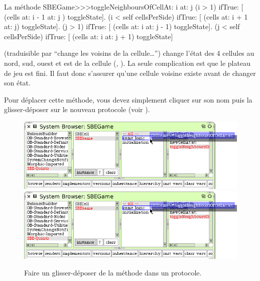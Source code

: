 \documentclass[a4paper,10pt,twoside]{book}
\begin{document}
\begin{method}[toggleNeighboursOfCellAt:at:]{La méthode \callback}
SBEGame>>>toggleNeighboursOfCellAt: i at: j
   (i > 1) ifTrue: [ (cells at: i - 1 at: j ) toggleState].
   (i < self cellsPerSide) ifTrue: [ (cells at: i + 1 at: j) toggleState].
   (j > 1) ifTrue: [ (cells at: i  at: j - 1) toggleState].
   (j < self cellsPerSide) ifTrue: [ (cells at: i at: j + 1) toggleState]
\end{method}

 (traduisible par ``change les
voisins de la cellule\ldots'') change l'état des 4 cellules au nord, sud, ouest et est de la cellule (, ). La seule complication est que le plateau de jeu est fini. Il faut donc s'assurer qu'une cellule voisine existe avant de changer son état.

Pour déplacer cette méthode, vous devez simplement cliquer sur son nom
puis la glisser-d\'eposer sur le nouveau protocole (voir ).

\begin{figure}[htbp]
   \centering
   \ifluluelse
		{\includegraphics[width=\textwidth]{DragMethod} }
		{\includegraphics[scale=0.7]{DragMethod} }
   \caption{Faire un glisser-déposer de la méthode dans un protocole.\label{fig:dragMethod}}
\end{figure}
\end{document}
